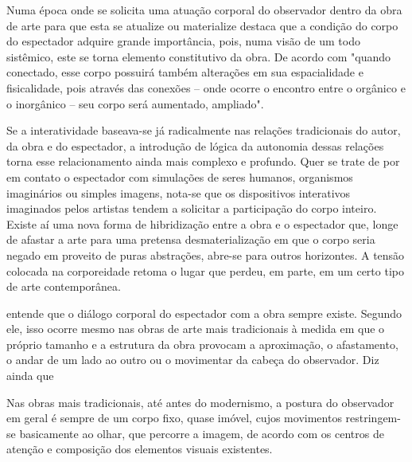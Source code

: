 Numa época onde se solicita uma atuação corporal do observador dentro da obra de arte para que esta se atualize ou materialize  destaca que a condição do corpo do espectador adquire grande importância, pois, numa visão de um todo sistêmico, este se torna elemento constitutivo da obra. De acordo com  "quando conectado, esse corpo possuirá também alterações em sua espacialidade e fisicalidade, pois através das conexões – onde ocorre o encontro entre o orgânico e o inorgânico – seu corpo será aumentado, ampliado".

\begin{citacao}
Se a interatividade baseava-se já radicalmente nas relações tradicionais do autor, da obra e do espectador, a introdução de lógica da autonomia dessas relações torna esse relacionamento ainda mais complexo e profundo. Quer se trate de por em contato o espectador com simulações de seres humanos, organismos imaginários ou simples imagens, nota-se que os dispositivos interativos imaginados pelos artistas tendem a solicitar a participação do corpo inteiro. Existe aí uma nova forma de hibridização entre a obra e o espectador que, longe de afastar a arte para uma pretensa desmaterialização em que o corpo seria negado em proveito de puras abstrações, abre-se para outros horizontes. A tensão colocada na corporeidade retoma o lugar que perdeu, em parte, em um certo tipo de arte contemporânea. \cite[p. 37]{couchot}  
\end{citacao}

	
 entende que o diálogo corporal do espectador com a obra sempre existe. Segundo ele, isso ocorre mesmo nas obras de arte mais tradicionais à medida em que o próprio tamanho e a estrutura da obra provocam a aproximação, o afastamento, o andar de um lado ao outro ou o movimentar da cabeça do observador. Diz ainda que

\begin{citacao}
Nas obras mais tradicionais, até antes do modernismo, a postura do observador em geral é sempre de um corpo fixo, quase imóvel, cujos movimentos restringem-se basicamente ao olhar, que percorre a imagem, de acordo com os centros de atenção e composição dos elementos visuais existentes. \cite{sogabe} 
\end{citacao}

